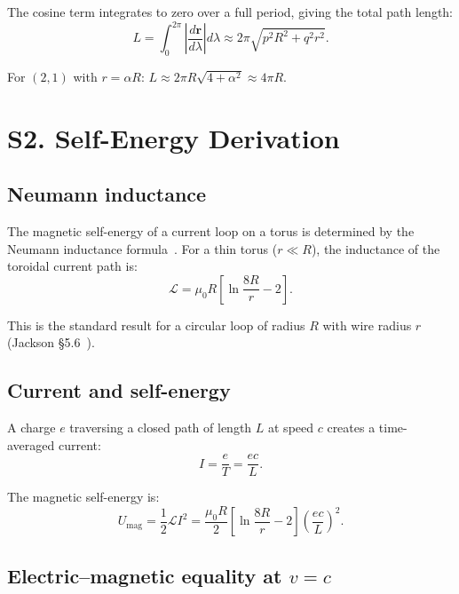 \documentclass[11pt,a4paper]{article}
\begin{document}
The cosine term integrates to zero over a full period, giving the total path length:
\begin{equation}
  L = \int_0^{2\pi}\left|\frac{d\mathbf{r}}{d\lambda}\right| d\lambda \approx 2\pi\sqrt{p^2 R^2 + q^2 r^2}.
\end{equation}

For $(2,1)$ with $r = \alpha R$: $L \approx 2\pi R\sqrt{4 + \alpha^2} \approx 4\pi R$.

\section{S2. Self-Energy Derivation}
\label{sec:S2}

\subsection{Neumann inductance}

The magnetic self-energy of a current loop on a torus is determined by the Neumann inductance formula~\cite{jackson1999}. For a thin torus ($r \ll R$), the inductance of the toroidal current path is:
\begin{equation}
  \mathcal{L} = \mu_0 R\left[\ln\frac{8R}{r} - 2\right].
\end{equation}

This is the standard result for a circular loop of radius $R$ with wire radius $r$ (Jackson \S5.6~\cite{jackson1999}).

\subsection{Current and self-energy}

A charge $e$ traversing a closed path of length $L$ at speed $c$ creates a time-averaged current:
\begin{equation}
  I = \frac{e}{T} = \frac{ec}{L}.
\end{equation}

The magnetic self-energy is:
\begin{equation}
  U_{\text{mag}} = \frac{1}{2}\mathcal{L}I^2 = \frac{\mu_0 R}{2}\left[\ln\frac{8R}{r} - 2\right]\left(\frac{ec}{L}\right)^{\!2}.
\end{equation}

\subsection{Electric--magnetic equality at \texorpdfstring{$v = c$}{v = c}}
\end{document}
